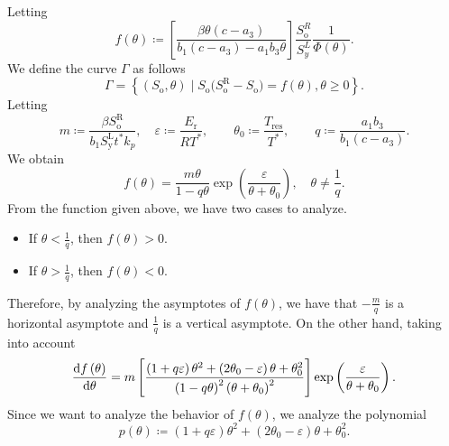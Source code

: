 Letting
\begin{equation*}
	f\left(\theta\right)\coloneqq
	\left[
		\frac{\beta\theta\left(c-a_{3}\right)}{b_{1}\left(c-a_{3}\right)-a_{1}b_{3}\theta}
		\right]
	\frac{S^{R}_{\text{o}}}{S^{L}_{y}}
	\frac{1}{\Phi\left(\theta\right)}.
\end{equation*}
We define the curve $\Gamma$ as follows
\begin{equation*}
	\Gamma=
	\left\{
	\left(S_{\text{o}},\theta\right)\mid
	S_{\text{o}}
	\big(
	S^{\text{R}}_{\text{o}}-
	S_{\text{o}}
	\big)=
	f\left(\theta\right),\theta\geq0
	\right\}.
\end{equation*}
Letting
\begin{equation*}
	m\coloneqq
	\frac{\beta S^{\text{R}}_{\text{o}}}{b_{1}S^{\text{L}}_{\text{y}}t^{\ast}k_{p}},\quad
	\varepsilon\coloneqq
	\frac{E_{\text{r}}}{RT^{\ast}},\qquad
	\theta_{0}\coloneqq
	\frac{T_{\text{res}}}{T^{\ast}},\qquad
	q\coloneqq
	\frac{a_{1}b_{3}}{b_{1}\left(c-a_{3}\right)}.
\end{equation*}
We obtain
\begin{equation*}
	f\left(\theta\right)=
	\frac{m\theta}{1-q\theta}
	\exp\left(\frac{\varepsilon}{\theta+\theta_{0}}\right),\quad\theta\neq\frac{1}{q}.
\end{equation*}
From the function given above, we have two cases to analyze.
\begin{itemize}
	\item If $\theta<\frac{1}{q}$, then $f\left(\theta\right)>0$.
	\item If $\theta>\frac{1}{q}$, then $f\left(\theta\right)<0$.
\end{itemize}
Therefore, by analyzing the asymptotes of $f\left(\theta\right)$, we have that $-\frac{m}{q}$ is a horizontal asymptote
and $\frac{1}{q}$ is a vertical asymptote.
On the other hand, taking into account
\begin{equation*}
	\diff{f\left(\theta\right)}{\theta}=
	m
	\left[
		\frac{
			\left(1+q\varepsilon\right)\theta^{2}+\left(2\theta_{0}-\varepsilon\right)\theta+\theta_{0}^{2}}{
			\left(1-q\theta\right)^{2}\left(\theta+\theta_{0}\right)^{2}
		}
		\right]
	\exp\left(\frac{\varepsilon}{\theta+\theta_{0}}\right).
\end{equation*}
Since we want to analyze the behavior of $f\left(\theta\right)$, we analyze the polynomial
\begin{equation*}
	p\left(\theta\right)\coloneqq
	\left(1+q\varepsilon\right)\theta^{2}+\left(2\theta_{0}-\varepsilon\right)\theta+\theta_{0}^{2}.
\end{equation*}
